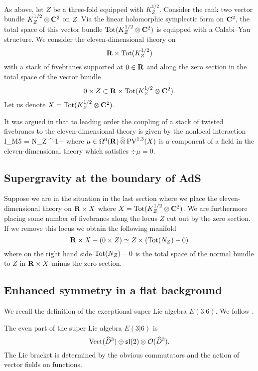 As above, let $Z$ be a three-fold equipped with $K^{1/2}_Z$.
Consider the rank two vector bundle $K^{1/2}_Z \otimes \mathbf{C}^2$ on $Z$. 
Via the linear holomorphic symplectic form on $\mathbf{C}^2$, the total space of this vector bundle ${\rm Tot}(K^{1/2}_Z \otimes \mathbf{C}^2)$ is equipped with a Calabi--Yau structure. 
We consider the eleven-dimensional theory on 
\[
\mathbf{R} \times {\rm Tot}(K^{1/2}_Z) 
\]
with a stack of fivebranes supported at $0 \in \mathbf{R}$ and along the zero section in the total space of the vector bundle
\[
0 \times Z \subset \mathbf{R} \times {\rm Tot}(K^{1/2}_Z \otimes \mathbf{C}^2)  .
\]
Let us denote $X = {\rm Tot}(K^{1/2}_Z \otimes \mathbf{C}^2)$. 

It was argued in \cite{RSW} that to leading order the coupling of a stack of twisted fivebranes to the eleven-dimensional theory is given by the nonlocal interaction 
\beqn\label{eqn:br1}
I_{M5} = N\int_{Z} \div^{-1}\mu \vee \Omega +\cdots 
\eeqn
where $\mu \in \Omega^0 (\mathbf{R}) \, \widehat{\otimes} \, {\rm PV}^{1,3}(X)$ is a component of a field in the eleven-dimensional theory which satisfies $\div \mu = 0$. 

\subsection{Supergravity at the boundary of AdS}

Suppose we are in the situation in the last section where we place the eleven-dimensional theory on $\mathbf{R} \times X$ where $X = {\rm Tot}(K^{1/2}_Z \otimes \mathbf{C}^2)$. 
We are furthermore placing some number of fivebranes along the locus $Z$ cut out by the zero section. 
If we remove this locus we obtain the following manifold 
\[
\mathbf{R} \times X - \left(0 \times Z\right) \simeq Z \times \left({\rm Tot}(N_Z) - 0\right) 
\]
where on the right hand side ${\rm Tot}(N_Z) - 0$ is the total space of the normal bundle to $Z$ in $\mathbf{R} \times X$ minus the zero section.


\subsection{Enhanced symmetry in a flat background}

\parsec[s:e36]

We recall the definition of the exceptional super Lie algebra $E(3|6)$. 
We follow \cite{Kac_class, KacRudakov}.

The even part of the super Lie algebra $E(3|6)$ is 
\[
\operatorname{Vect}(\widehat{D}^3) \oplus \mathfrak{sl}(2) \otimes \mathcal O(\widehat{D}^3) .
\]
The Lie bracket is determined by the obvious commutators and the action of vector fields on functions. 

